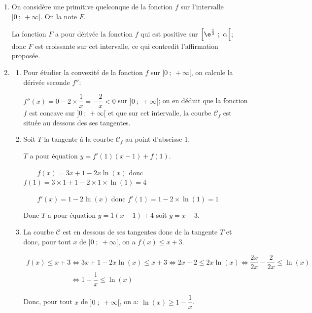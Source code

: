 \begin{enumerate}
\begin{enumerate}
		
	\end{enumerate}	
\item On considère une primitive quelconque de la fonction $f$ sur
l'intervalle $]0~;~+\infty[$. On la note $F$.



La fonction $F$ a pour dérivée la fonction $f$ qui est positive sur $\left[\e^{\frac12}~;~\alpha\right[$; donc $F$ est croissante sur cet intervalle, ce qui contredit l'affirmation proposée.
\item
	\begin{enumerate}
		\item Pour étudier la convexité de la fonction $f$ sur $]0~;~+\infty[$, on calcule la dérivée seconde $f''$:
		
$f''(x)=0-2\times \dfrac{1}{x}=-\dfrac{2}{x}<0$ sur $]0~;~+\infty[$; on en déduit que la fonction $f$ est concave sur $]0~;~+\infty[$ et que sur cet intervalle,  la courbe $\mathcal{C}_f$ est située au dessous des ses tangentes.
		\item Soit $T$ la tangente à la courbe $\mathcal{C}_f$ au point d'abscisse 1.

$T$ a pour équation $y=f'(1)\left (x-1\right ) + f(1)$.

~~\textbullet~~$f(x)=3x+1-2x\ln(x)$ donc $f(1)=3\times 1 +1 -2\times 1 \times \ln(1)=4$

~~\textbullet~~$f'(x)=1-2\ln(x)$ donc $f'(1)=1-2\times\ln(1)=1$

Donc $T$ a pour équation $y=1\left (x-1\right ) +4$ soit $y=x+3$.
		
		\item 
La courbe $\mathcal{C}$ est en dessous de ses tangentes donc de la tangente $T$ et donc, pour tout $x$ de $]0\;;\;+\infty[$, on a $f(x)\leqslant x+3$.

$\begin{gathered}f(x)\leqslant x+3
\iff 3x+1-2x\ln(x) \leqslant x+3
\iff 2x-2 \leqslant 2x\ln(x)
\iff \dfrac{2x}{2x} - \dfrac{2}{2x} \leqslant \ln(x)\\
\phantom{f(x)\leqslant x+3}
\iff 1-\dfrac{1}{x} \leqslant \ln(x)\end{gathered}$

Donc, pour tout  $x$ de $]0\;;\;+\infty[$, on a: $\ln(x)\geqslant 1-\dfrac{1}{x}$.
		
	\end{enumerate}
\end{enumerate}

\bigskip
